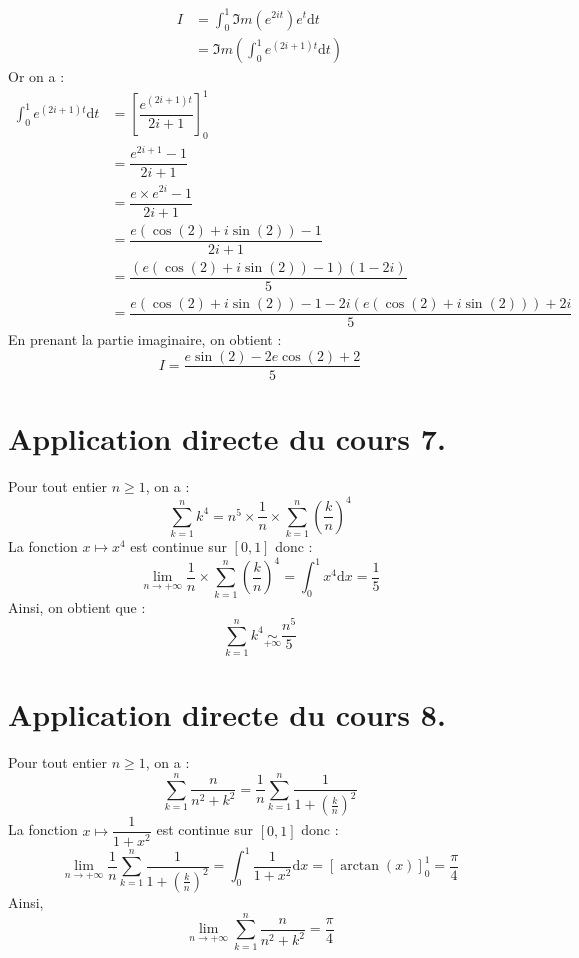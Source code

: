 \documentclass[french,11pt,twoside]{VcCours}
\newcommand{\dx}{\text{d}x}
\newcommand{\dt}{\text{d}t}
\newcommand{\Sum}[2]{\sum_{#1}^{#2}}
\begin{document}
\begin{align*}
I & = \int_{0}^{1} \Im m(e^{2it}) e^t \dt \\
& = \Im m \left(\int_{0}^1e^{(2i+1)t} \dt\right) 
\end{align*}
Or on a :
\begin{align*}
\int_{0}^1e^{(2i+1)t} \dt  & = \left[ \dfrac{e^{(2i+1)t}}{2i+1} \right]_{0}^1 \\
& = \dfrac{e^{2i+1}-1}{2i+1} \\
& = \dfrac{e\times e^{2i} - 1 }{2i+1} \\
& = \dfrac{e(\cos(2)+i \sin(2))-1}{2i+1} \\
& = \dfrac{(e(\cos(2)+i \sin(2))-1)(1-2i)}{5} \\
& = \dfrac{e(\cos(2)+i \sin(2))-1-2i(e(\cos(2)+i \sin(2)))+2i}{5} 
\end{align*}
En prenant la partie imaginaire, on obtient :
$$ I= \dfrac{e\sin(2)-2e\cos(2)+2}{5}$$
 
 
\medskip

\section*{Application directe du cours 7.}

Pour tout entier $n \geq 1$, on a :
$$ \Sum{k=1}{n} k^4 =  n^5 \times \frac{1}{n} \times \Sum{k=1}{n} \left(\frac{k}{n} \right)^4 $$
La fonction $x \mapsto x^4$ est continue sur $[0,1]$ donc :
$$ \lim_{n \rightarrow + \infty}  \frac{1}{n} \times \Sum{k=1}{n} \left(\dfrac{k}{n} \right)^4 = \int_{0}^1 x^4 \dx = \frac{1}{5}$$
Ainsi, on obtient que :
$$ \Sum{k=1}{n} k^4  \underset{+ \infty}{\sim} \dfrac{n^5}{5}$$

\medskip

\section*{Application directe du cours 8.}

Pour tout entier $n \geq 1$, on a :
$$ \sum_{k = 1}^{n} \frac{n}{n^{2} + k^{2}} = \frac{1}{n} \sum_{k = 1}^{n} \frac{1}{1 + \left(\frac{k}{n}\right)^{2}}$$
La fonction $x \mapsto \dfrac{1}{1+x^2}$ est continue sur $[0,1]$ donc :
$$ \lim_{n \rightarrow + \infty}  \frac{1}{n} \sum_{k = 1}^{n} \frac{1}{1 + \left(\frac{k}{n}\right)^{2}} = \int_{0}^{1} \dfrac{1}{1+x^2} \dx = \left[\arctan(x) \right]_{0}^1 = \dfrac{\pi}{4}$$
Ainsi,
$$ \lim_{n \rightarrow + \infty}  \sum_{k = 1}^{n} \frac{n}{n^{2} + k^{2}} = \dfrac{\pi}{4} $$
\end{document}
